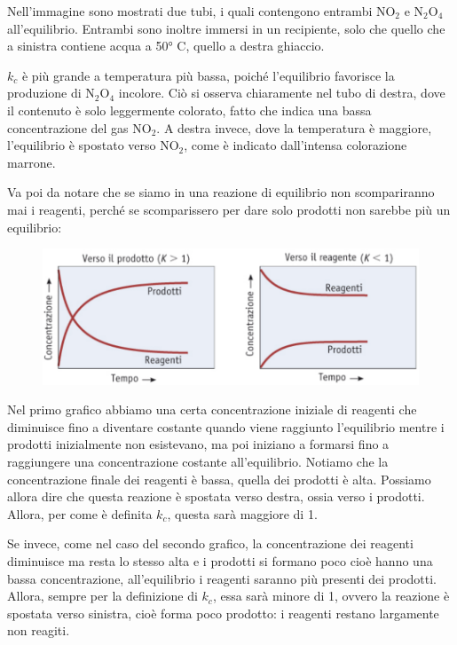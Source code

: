 Nell'immagine sono mostrati due tubi, i quali contengono entrambi NO$_2$ e N$_2$O$_4$ all'equilibrio. Entrambi sono inoltre immersi in un recipiente, solo che quello che a sinistra contiene acqua a 50° C, quello a destra ghiaccio.

$k_c$ è più grande a temperatura più bassa, poiché l'equilibrio favorisce la produzione di N$_2$O$_4$ incolore. Ciò si osserva chiaramente nel tubo di destra, dove il contenuto è solo leggermente colorato, fatto che indica una bassa concentrazione del gas NO$_2$. A destra invece, dove la temperatura è maggiore, l'equilibrio è spostato verso NO$_2$, come è indicato dall'intensa colorazione marrone.

\vspace{0.2cm}Va poi da notare che se siamo in una reazione di equilibrio non scompariranno mai i reagenti, perché se scomparissero per dare solo prodotti non sarebbe più un equilibrio:

\begin{figure}[H]
    \centering
    \includegraphics[width=15cm]{immagini/reazioni_equilibrio_spostato.png}
\end{figure}

Nel primo grafico abbiamo una certa concentrazione iniziale di reagenti che diminuisce fino a diventare costante quando viene raggiunto l'equilibrio mentre i prodotti inizialmente non esistevano, ma poi iniziano a formarsi fino a raggiungere una concentrazione costante all'equilibrio. Notiamo che la concentrazione finale dei reagenti è bassa, quella dei prodotti è alta. Possiamo allora dire che questa reazione è spostata verso destra, ossia verso i prodotti. Allora, per come è definita $k_c$, questa sarà maggiore di 1.

Se invece, come nel caso del secondo grafico, la concentrazione dei reagenti diminuisce ma resta lo stesso alta e i prodotti si formano poco cioè hanno una bassa concentrazione, all'equilibrio i reagenti saranno più presenti dei prodotti. Allora, sempre per la definizione di $k_c$, essa sarà minore di 1, ovvero la reazione è spostata verso sinistra, cioè forma poco prodotto: i reagenti restano largamente non reagiti.

